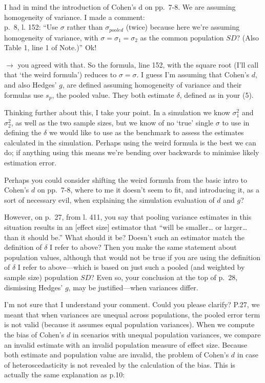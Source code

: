 \documentclass[
  12pt,
  french,
]{article}
\begin{document}
\color{brown} I had in mind the introduction of Cohen's d on pp.~7-8. We
are assuming homogeneity of variance. I made a comment:\\
p.~8, l. 152: ``Use \(\sigma\) rather than \(\sigma_{pooled}\) (twice)
because here we're assuming homogeneity of variance, with
\(\sigma = \sigma_1 =\sigma_2\) as the common population \(SD\)? (Also
Table 1, line 1 of Note.)'' Ok!

\(\rightarrow\) you agreed with that. So the formula, line 152, with the
square root (I'll call that `the weird formula') reduces to
\(\sigma = \sigma\). I guess I'm assuming that Cohen's \(d\), and also
Hedges' \(g\), are defined assuming homogeneity of variance and their
formulas use \(s_p\), the pooled value. They both estimate \(\delta\),
defined as in your (5).

Thinking further about this, I take your point. In a simulation we know
\(\sigma_1^2\) and \(\sigma_2^2\), as well as the two sample sizes, but
we know of no `true' single \(\sigma\) to use in defining the \(\delta\)
we would like to use as the benchmark to assess the estimates calculated
in the simulation. Perhaps using the weird formula is the best we can
do; if anything using this means we're bending over backwards to
minimise likely estimation error.

Perhaps you could consider shifting the weird formula from the basic
intro to Cohen's \(d\) on pp.~7-8, where to me it doesn't seem to fit,
and introducing it, as a sort of necessary evil, when explaining the
simulation evaluation of \(d\) and \(g\)?

\color{black} However, on p.~27, from l. 411, you say that pooling
variance estimates in this situation results in an {[}effect size{]}
estimator that ``will be smaller\ldots{} or larger\ldots{} than it
should be.'' What should it be? Doesn't such an estimator match the
definition of \(\delta\) I refer to above? Then you make the same
statement about population values, although that would not be true if
you are using the definition of \(\delta\) I refer to above---which is
based on just such a pooled (and weighted by sample size) population
\(SD\)? Even so, your conclusion at the top of p.~28, dismissing Hedges'
\(g\), may be justified---when variances differ.

\color{blue} I'm not sure that I understand your comment. Could you
please clarify? P.27, we meant that when variances are unequal across
populations, the pooled error term is not valid (because it assumes
equal population variances). When we compute the bias of Cohen's \(d\)
in scenarios with unequal population variances, we compare an invalid
estimate with an invalid population measure of effect size. Because both
estimate and population value are invalid, the problem of Cohen's \(d\)
in case of heteroscedasticity is not revealed by the calculation of the
bias. This is actually the same explanation as p.10:
\end{document}

